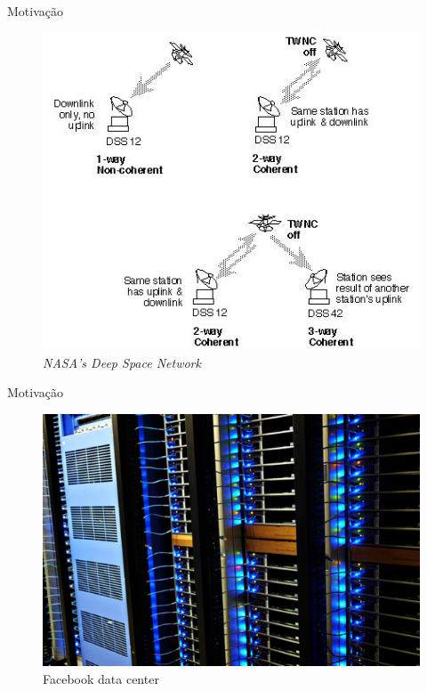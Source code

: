 
  \begin{frame}{Motivação}
   \begin{figure}[h]
     \centering
     \includegraphics[scale=.4]{bsfii6.jpg}
     \caption{\emph{NASA's Deep Space Network}\cite{Plank:2004}}
     \label{fig2:nasa}
   \end{figure}
  \end{frame}

  \begin{frame}{Motivação}
   \begin{figure}[h]
     \centering
     \includegraphics[scale=.5]{facebook-data-center.jpg}
     \caption{Facebook data center\cite{Plank:2004}}
     \label{fig5:fdc}
   \end{figure}
  \end{frame}

